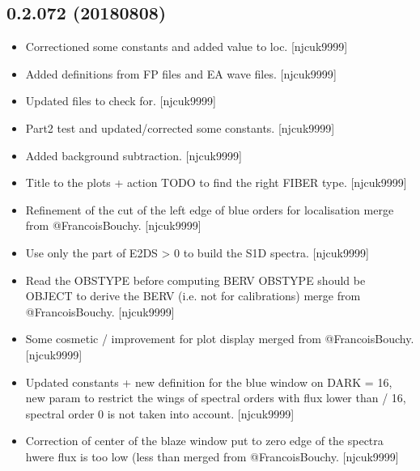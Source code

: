 \documentclass[a4paper,10pt,english]{report}
\begin{document}
\subsection{0.2.072 (2018\sphinxhyphen{}08\sphinxhyphen{}08)}
\label{\detokenize{misc/changelog:id396}}\begin{itemize}
\item {} 
Correctioned some constants and added value to loc. {[}njcuk9999{]}

\item {} 
Added definitions from FP files and EA wave files. {[}njcuk9999{]}

\item {} 
Updated  files to check for. {[}njcuk9999{]}

\item {} 
Part2 test and updated/corrected some constants. {[}njcuk9999{]}

\item {} 
Added background subtraction. {[}njcuk9999{]}

\item {} 
Title to the plots + action TODO to find the right FIBER type.
{[}njcuk9999{]}

\item {} 
Refinement of the cut of the left edge of blue orders for localisation
\sphinxhyphen{} merge from @FrancoisBouchy. {[}njcuk9999{]}

\item {} 
Use only the part of E2DS \textgreater{} 0 to build the S1D spectra. {[}njcuk9999{]}

\item {} 
Read the OBSTYPE before computing BERV \sphinxhyphen{} OBSTYPE should be OBJECT to
derive the BERV (i.e. not for calibrations) \sphinxhyphen{} merge from
@FrancoisBouchy. {[}njcuk9999{]}

\item {} 
Some cosmetic / improvement for plot display \sphinxhyphen{} merged from
@FrancoisBouchy. {[}njcuk9999{]}

\item {} 
Updated constants + new definition for the blue window on DARK \sphinxhyphen{}
 = 16, new param to restrict the wings of spectral
orders with flux lower than  / 16, spectral order 0 is
not taken into account. {[}njcuk9999{]}

\item {} 
Correction of center of the blaze window \sphinxhyphen{} put to zero edge of the
spectra hwere flux is too low (less than 
 \sphinxhyphen{} merged from @FrancoisBouchy. {[}njcuk9999{]}


\end{itemize}
\end{document}
